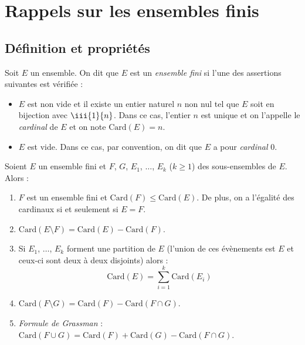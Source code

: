 \documentclass[french,11pt,twoside]{VcCours}
\begin{document}

\tableofcontents
\separationTitre

\section{Rappels sur les ensembles finis}
\subsection{Définition et propriétés}

\begin{TheoremeDefinition}{} Soit $E$ un ensemble. On dit que $E$ est un 
  \emph{ensemble fini} si l'une des assertions suivantes est vérifiée :
\begin{itemize}
\item $E$ est non vide et il existe un entier naturel $n$ non nul tel que $E$ 
soit en bijection avec $\iii{1}{n}$. Dans ce cas, l'entier $n$ est unique 
et on l'appelle le \emph{cardinal} de $E$ et on note $\textrm{Card}(E)=n$.
\item $E$ est vide. Dans ce cas, par convention, on dit que $E$ a pour \emph{cardinal} $0$.
\end{itemize}
\end{TheoremeDefinition}

\begin{Proposition}{} Soient $E$ un ensemble fini et $F$, $G$, $E_1$,
$\ldots$, $E_k$ ($k \geq 1$) des sous-ensembles de $E$. Alors :
\begin{enumerate}
\item $F$ est un ensemble fini et $\textrm{Card}(F) \leq \textrm{Card}(E) $. 
De plus, on a l'égalité des cardinaux si et seulement si $E=F$.
\item $\textrm{Card}(E \setminus F)= \textrm{Card}(E) - \textrm{Card}(F)$.
\item Si $E_1$, $\ldots$, $E_k$ forment une partition de $E$ (l'union de ces 
évènements est $E$ et ceux-ci sont deux à deux disjoints) alors :
$$ \textrm{Card}(E) = \sum_{i=1}^k \textrm{Card}(E_i) $$
\item $\textrm{Card}(F \setminus G) = \textrm{Card}(F) - \textrm{Card}(F \cap G)$.
\item \emph{Formule de Grassman} : $\textrm{Card}(F \cup G) = \textrm{Card}(F) 
+ \textrm{Card}(G) - \textrm{Card}(F \cap G)$.
\end{enumerate}
\end{Proposition}
\end{document}
